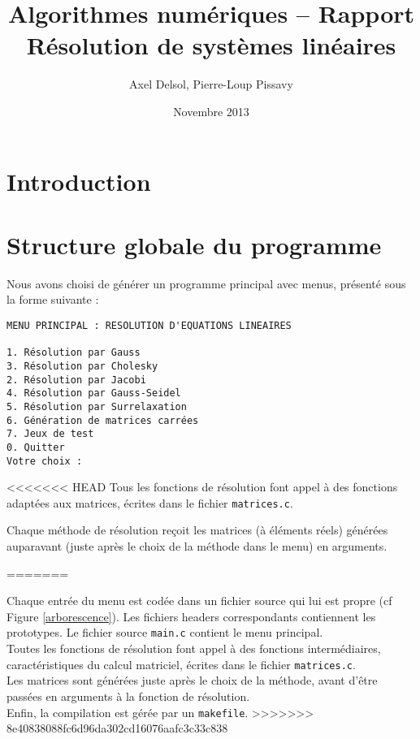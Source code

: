 \documentclass{report}
\title{Algorithmes numériques -- Rapport \\ \vspace{0.5cm}Résolution de systèmes linéaires}
\author{Axel Delsol, Pierre-Loup Pissavy}
\date{Novembre 2013}
\begin{document}
  \maketitle
  \tableofcontents

  \chapter*{Introduction}
    \lipsum[1-5]
  \chapter{Structure globale du programme}
    Nous avons choisi de générer un programme principal avec menus, présenté sous la forme suivante :

    \begin{lstlisting}[style=apercu, name=Menu Principal]
MENU PRINCIPAL : RESOLUTION D'EQUATIONS LINEAIRES

1. Résolution par Gauss
3. Résolution par Cholesky
2. Résolution par Jacobi
4. Résolution par Gauss-Seidel
5. Résolution par Surrelaxation
6. Génération de matrices carrées
7. Jeux de test
0. Quitter
Votre choix : 
	\end{lstlisting}
<<<<<<< HEAD
	Tous les fonctions de résolution font appel à des fonctions adaptées aux matrices, écrites dans le fichier \verb"matrices.c".
    
    Chaque méthode de résolution reçoit les matrices (à éléments réels) générées auparavant (juste après le choix de la méthode dans le menu) en arguments.
    
=======
	
	Chaque entrée du menu est codée dans un fichier source qui lui est propre (cf Figure \ref{arborescence}). Les fichiers headers correspondants contiennent les prototypes. Le fichier source \verb"main.c" contient le menu principal.\\
	
	Toutes les fonctions de résolution font appel à des fonctions intermédiaires, caractéristiques du calcul matriciel, écrites dans le fichier \verb"matrices.c".\\
	
    

    Les matrices sont générées juste après le choix de la méthode, avant d'être passées en arguments à la fonction de résolution.\\

	Enfin, la compilation est gérée par un \verb"makefile".     
>>>>>>> 8e40838088fc6d96da302cd16076aafc3c33c838
\end{document}
